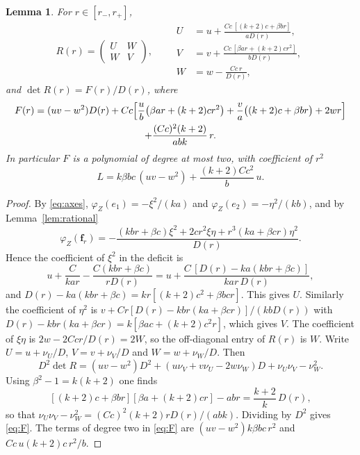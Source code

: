 \documentclass[11pt]{amsart}
\newtheorem{lemma}[theorem]{Lemma}
\theoremstyle{definition}
\theoremstyle{remark}
\numberwithin{equation}{section}
\newcommand{\bff}{\mathbf{f}}
\begin{document}
\begin{lemma}\label{lem:Rformula}
For $r\in[r_-,r_+]$,
\begin{equation}\label{eq:UVW}
R(r)=\begin{pmatrix}U&W\\ W&V\end{pmatrix},\qquad
\begin{aligned}
U&=u+\frac{Cc\,[(k+2)c+\beta br]}{aD(r)},\\
V&=v+\frac{Cc\,[\beta ar+(k+2)cr^2]}{bD(r)},\\
W&=w-\frac{Cc\,r}{D(r)},
\end{aligned}
\end{equation}
and $\det R(r)=F(r)/D(r)$, where
\begin{multline}\label{eq:F}
F(r)=(uv-w^2)D(r)+Cc\Bigl[\frac ub\bigl(\beta ar+(k+2)cr^2\bigr)+\frac va\bigl((k+2)c+\beta br\bigr)+2wr\Bigr]\\
+\frac{(Cc)^2(k+2)}{abk}\,r .
\end{multline}
In particular $F$ is a polynomial of degree at most two, with coefficient of $r^2$
\begin{equation}\label{eq:L}
L=k\beta bc\,(uv-w^2)+\frac{(k+2)Cc^2}{b}\,u .
\end{equation}
\end{lemma}

\begin{proof}
By \eqref{eq:axes}, $\varphi_Z(e_1)=-\xi^2/(ka)$ and $\varphi_Z(e_2)=-\eta^2/(kb)$, and by Lemma~\ref{lem:rational}
\[
\varphi_Z(\bff_r)=-\frac{(kbr+\beta c)\xi^2+2cr^2\xi\eta+r^3(ka+\beta cr)\eta^2}{D(r)} .
\]
Hence the coefficient of $\xi^2$ in the deficit is
\[
u+\frac C{kar}-\frac{C(kbr+\beta c)}{rD(r)}=u+\frac{C\,[D(r)-ka(kbr+\beta c)]}{kar\,D(r)},
\]
and $D(r)-ka(kbr+\beta c)=kr[(k+2)c^2+\beta bcr]$. This gives $U$. Similarly the coefficient of $\eta^2$ is $v+Cr[D(r)-kbr(ka+\beta cr)]/(kbD(r))$ with $D(r)-kbr(ka+\beta cr)=k[\beta ac+(k+2)c^2r]$, which gives $V$. The coefficient of $\xi\eta$ is $2w-2Ccr/D(r)=2W$, so the off-diagonal entry of $R(r)$ is $W$. Write $U=u+\nu_U/D$, $V=v+\nu_V/D$ and $W=w+\nu_W/D$. Then
\[
D^2\det R=(uv-w^2)D^2+(u\nu_V+v\nu_U-2w\nu_W)D+\nu_U\nu_V-\nu_W^2 .
\]
Using $\beta^2-1=k(k+2)$ one finds
\[
[(k+2)c+\beta br][\beta a+(k+2)cr]-abr=\frac{k+2}k\,D(r),
\]
so that $\nu_U\nu_V-\nu_W^2=(Cc)^2(k+2)rD(r)/(abk)$. Dividing by $D^2$ gives \eqref{eq:F}. The terms of degree two in \eqref{eq:F} are $(uv-w^2)k\beta bc\,r^2$ and $Cc\,u(k+2)c\,r^2/b$.
\end{proof}
\end{document}

